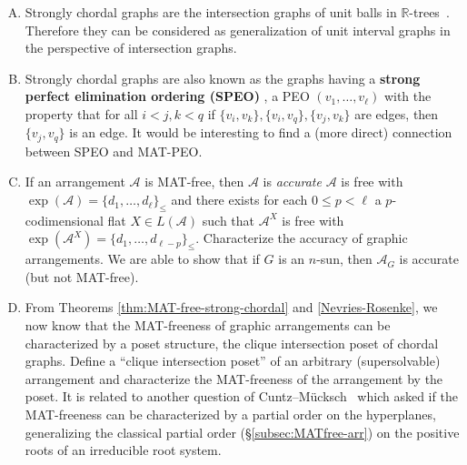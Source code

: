 \documentclass[ALCO, Unicode,published]{cedram}
\newcommand{\A}{\mathcal{A}}
\begin{document}
\begin{enumerate}[(A)]
 \begin{figure}[htbp]
\centering
{}\caption{The rising sun.}
\label{fig:rsun}
\end{figure}


\item Strongly chordal graphs are the intersection graphs of unit balls in $ \mathbb{R} $-trees~\cite{kuroda2021unit-gac}. 
Therefore they can be considered as generalization of unit interval graphs in the perspective of intersection graphs. 


\item 
Strongly chordal graphs are also known as the graphs having a \textbf{strong perfect elimination ordering (SPEO)} \cite{Far83}, \ie  a PEO $ (v_{1}, \dots, v_{\ell}) $ with the property that for all $i<j, k<q$ if $\{v_i, v_k\}, \{v_i, v_q\} , \{v_j, v_k\}$ are edges, then~$ \{v_j, v_q\}$ is an edge.
It would be interesting to find a (more direct) connection between SPEO and MAT-PEO.


\item If an arrangement $\A$ is MAT-free, then $\A$ is \emph{accurate}  \cite[Theorem 1.2]{MR21} \ie  $\A$ is free  with $\exp(\A) =\{d_1, \ldots, d_\ell\}_{\le}$ and there exists for each $0 \le p <\ell$ a $p$-codimensional flat $X\in L(\A)$ such that $\A^X$ is free with  $\exp(\A^X)=\{d_1,\ldots, d_{\ell-p}\}_{\le}$.
Characterize the accuracy of graphic arrangements. 
We are able to show that if $G$ is an $n$-sun, then $\A_G$ is accurate (but not MAT-free).
\item From  Theorems \ref{thm:MAT-free-strong-chordal} and \ref{Nevries-Rosenke}, we now know that the MAT-freeness of graphic arrangements can be characterized by a poset structure, the clique intersection poset of chordal graphs. 
Define a ``clique intersection poset'' of an arbitrary (supersolvable) arrangement and characterize the MAT-freeness of the arrangement by the poset.
It is related to another question of Cuntz--M{\"u}cksch~\cite[Problem 47]{CM20} which asked if the MAT-freeness can be characterized by a partial order on the hyperplanes, generalizing the classical partial order (\S\ref{subsec:MATfree-arr}) on the positive roots of an irreducible root system. 
\end{enumerate}
 




\end{document}
